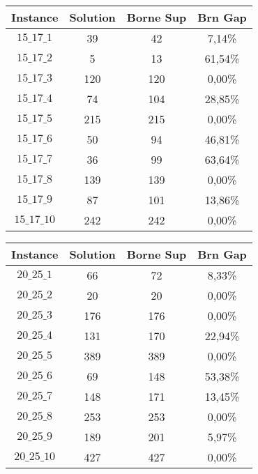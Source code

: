 \documentclass[a4paper, 11pt]{article} %
\begin{document}
\begin{center}
\begin{figure}[H]
   \begin{minipage}[c]{.46\linewidth}
      \begin{tabular}{|c|c|c|c|}
      \hline 
        Instance & Solution & Borne Sup & Brn Gap  \\ \hline
$15\_17\_1$ & 39 &   42 &   7,14\% \\ \hline
$15\_17\_2$ & 5 &  13 &   61,54\% \\ \hline
$15\_17\_3$ & 120 &  120 &  0,00\% \\ \hline
$15\_17\_4$ & 74 &   104 &  28,85\% \\ \hline
$15\_17\_5$ & 215 &  215 &  0,00\% \\ \hline
$15\_17\_6$ & 50 &   94 &   46,81\% \\ \hline
$15\_17\_7$ & 36 &   99 &   63,64\% \\ \hline
$15\_17\_8$ & 139 &  139 &  0,00\% \\ \hline
$15\_17\_9$ & 87 &   101 &  13,86\% \\ \hline
$15\_17\_10$ &242 &  242 &  0,00\% \\ \hline
      \end{tabular}
   \end{minipage} \hfill
   \begin{minipage}[c]{.46\linewidth}
      \begin{tabular}{|c|c|c|c|}
      \hline 
        Instance & Solution & Borne Sup & Brn Gap  \\ \hline
$20\_25\_1$ & 66 &   72 &   8,33\% \\ \hline
$20\_25\_2$ & 20 &   20 &   0,00\% \\ \hline
$20\_25\_3$ & 176 &  176 &  0,00\% \\ \hline
$20\_25\_4$ & 131 &  170 &  22,94\% \\ \hline
$20\_25\_5$ & 389 &  389 &  0,00\% \\ \hline
$20\_25\_6$ & 69 &   148 &  53,38\% \\ \hline
$20\_25\_7$ & 148 &  171 &  13,45\% \\ \hline
$20\_25\_8$ & 253 &  253 &  0,00\% \\ \hline
$20\_25\_9$ & 189 &  201 &  5,97\% \\ \hline
$20\_25\_10$ &427 &  427 &  0,00\% \\ \hline
      \end{tabular}
   \end{minipage}
\end{figure}


\end{center}
\end{document}
